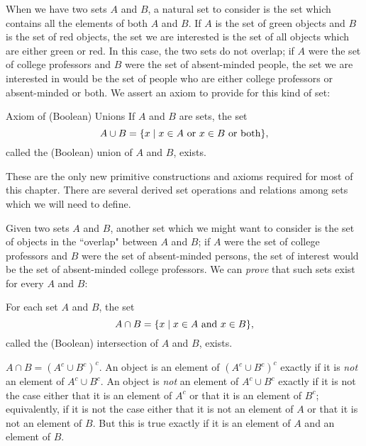 When we have two sets $A$ and $B$, a natural set to consider is
the set which contains all the elements of both $A$ and $B$.  If $A$ is the
set of green objects and $B$ is the set of red objects, the set we are
interested is the set of all objects which are either green or red.
In this case, the two sets do not overlap; if $A$ were the set of
college professors and $B$ were the set of absent-minded people, the
set we are interested in would be the set of people who are either
college professors or absent-minded or both.  We assert an axiom to
provide for this kind of set:

\begin{axiom}{Axiom of (Boolean)
Unions}
  If $A$ and $B$ are sets, the set
  $$
    A \cup B = \{x \mid \mbox{$x \in A$ or
    $x \in B$ or both}\},
  $$
  called the (Boolean) {\upshape union} of $A$ and $B$,
  exists.
\end{axiom}

These are the only new primitive constructions and axioms
required for most of this chapter.  There are several derived set
operations and relations among sets which we will need to define.

Given two sets $A$ and $B$, another set which we might want to
consider is the set of objects in the ``overlap" between $A$ and $B$; if $A$
were the set of college professors and $B$ were the set of absent-minded
persons, the set of interest would be the set of absent-minded college
professors.  We can {\itshape prove\/} that such sets exist for every $A$ and
$B$:

\begin{thm}
 For each set $A$ and $B$, the set
 $$
  A \cap B = \{x \mid \mbox{$x \in A$ and $x \in
     B$}\},
 $$
 called the (Boolean) {\upshape
 intersection} of
 $A$ and $B$, exists.
\end{thm}

\preuve $A \cap B = (A^c \cup B^c)^c$.  An object is an element of $(A^c \cup
B^c)^c$ exactly if it is {\itshape not\/} an element of $A^c \cup B^c$.  An
object is {\itshape not\/} an 
element of $A^c \cup B^c$ exactly if it is not the case either that it is an
element of $A^c$ or that it is an element of $B^c$; equivalently, if it is
not the case either that it is not an element of $A$ or that it is not
an element of $B$.  But this is true exactly if it is an element of $A$
and an element of $B$.\finpreuve

